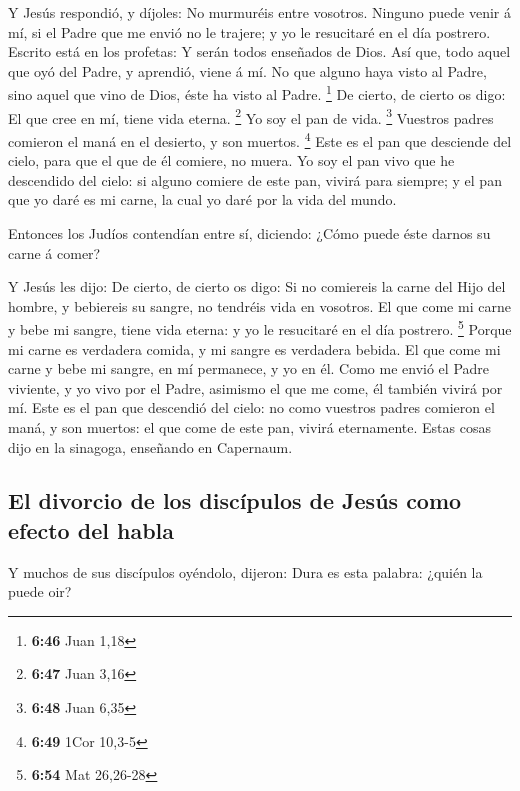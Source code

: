  Y Jesús respondió, y díjoles: No murmuréis entre vosotros.
 Ninguno puede venir á mí, si el Padre que me envió no le
trajere; y yo le resucitaré en el día postrero.  Escrito
está en los profetas: Y serán todos enseñados de Dios. Así que, todo
aquel que oyó del Padre, y aprendió, viene á mí.  No que
alguno haya visto al Padre, sino aquel que vino de Dios, éste ha visto
al Padre. \footnote{\textbf{6:46} Juan 1,18}  De cierto, de
cierto os digo: El que cree en mí, tiene vida eterna. \footnote{\textbf{6:47}
  Juan 3,16}  Yo soy el pan de vida. \footnote{\textbf{6:48}
  Juan 6,35}  Vuestros padres comieron el maná en el
desierto, y son muertos. \footnote{\textbf{6:49} 1Cor 10,3-5}
 Este es el pan que desciende del cielo, para que el que de
él comiere, no muera.  Yo soy el pan vivo que he descendido
del cielo: si alguno comiere de este pan, vivirá para siempre; y el pan
que yo daré es mi carne, la cual yo daré por la vida del mundo.

 Entonces los Judíos contendían entre sí, diciendo: ¿Cómo
puede éste darnos su carne á comer?

 Y Jesús les dijo: De cierto, de cierto os digo: Si no
comiereis la carne del Hijo del hombre, y bebiereis su sangre, no
tendréis vida en vosotros.  El que come mi carne y bebe mi
sangre, tiene vida eterna: y yo le resucitaré en el día postrero.
\footnote{\textbf{6:54} Mat 26,26-28}  Porque mi carne es
verdadera comida, y mi sangre es verdadera bebida.  El que
come mi carne y bebe mi sangre, en mí permanece, y yo en él.
 Como me envió el Padre viviente, y yo vivo por el Padre,
asimismo el que me come, él también vivirá por mí.  Este es
el pan que descendió del cielo: no como vuestros padres comieron el
maná, y son muertos: el que come de este pan, vivirá eternamente.
 Estas cosas dijo en la sinagoga, enseñando en Capernaum.

\hypertarget{el-divorcio-de-los-discuxedpulos-de-jesuxfas-como-efecto-del-habla}{%
\subsection{El divorcio de los discípulos de Jesús como efecto del
habla}\label{el-divorcio-de-los-discuxedpulos-de-jesuxfas-como-efecto-del-habla}}

 Y muchos de sus discípulos oyéndolo, dijeron: Dura es esta
palabra: ¿quién la puede oir?

